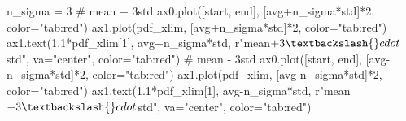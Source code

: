 \documentclass[
  letterpaper,
  DIV=11,
  numbers=noendperiod,
  oneside]{scrreprt}
\newenvironment{Shaded}{\begin{snugshade}}{\end{snugshade}}
\newcommand{\CommentTok}[1]{\textcolor[rgb]{0.37,0.37,0.37}{#1}}
\newcommand{\DecValTok}[1]{\textcolor[rgb]{0.68,0.00,0.00}{#1}}
\newcommand{\FloatTok}[1]{\textcolor[rgb]{0.68,0.00,0.00}{#1}}
\newcommand{\NormalTok}[1]{\textcolor[rgb]{0.00,0.23,0.31}{#1}}
\newcommand{\OperatorTok}[1]{\textcolor[rgb]{0.37,0.37,0.37}{#1}}
\newcommand{\StringTok}[1]{\textcolor[rgb]{0.13,0.47,0.30}{#1}}
\newcommand{\VerbatimStringTok}[1]{\textcolor[rgb]{0.13,0.47,0.30}{#1}}
\begin{document}
\begin{Shaded}
\begin{Highlighting}[]
\NormalTok{n\_sigma }\OperatorTok{=} \DecValTok{3}
\CommentTok{\# mean + 3std}
\NormalTok{ax0.plot([start, end], [avg}\OperatorTok{+}\NormalTok{n\_sigma}\OperatorTok{*}\NormalTok{std]}\OperatorTok{*}\DecValTok{2}\NormalTok{, color}\OperatorTok{=}\StringTok{"tab:red"}\NormalTok{)}
\NormalTok{ax1.plot(pdf\_xlim, [avg}\OperatorTok{+}\NormalTok{n\_sigma}\OperatorTok{*}\NormalTok{std]}\OperatorTok{*}\DecValTok{2}\NormalTok{, color}\OperatorTok{=}\StringTok{"tab:red"}\NormalTok{)}
\NormalTok{ax1.text(}\FloatTok{1.1}\OperatorTok{*}\NormalTok{pdf\_xlim[}\DecValTok{1}\NormalTok{], avg}\OperatorTok{+}\NormalTok{n\_sigma}\OperatorTok{*}\NormalTok{std, }\VerbatimStringTok{r"mean$+3\textbackslash{}cdot$std"}\NormalTok{, va}\OperatorTok{=}\StringTok{"center"}\NormalTok{, color}\OperatorTok{=}\StringTok{"tab:red"}\NormalTok{)}
\CommentTok{\# mean {-} 3std}
\NormalTok{ax0.plot([start, end], [avg}\OperatorTok{{-}}\NormalTok{n\_sigma}\OperatorTok{*}\NormalTok{std]}\OperatorTok{*}\DecValTok{2}\NormalTok{, color}\OperatorTok{=}\StringTok{"tab:red"}\NormalTok{)}
\NormalTok{ax1.plot(pdf\_xlim, [avg}\OperatorTok{{-}}\NormalTok{n\_sigma}\OperatorTok{*}\NormalTok{std]}\OperatorTok{*}\DecValTok{2}\NormalTok{, color}\OperatorTok{=}\StringTok{"tab:red"}\NormalTok{)}
\NormalTok{ax1.text(}\FloatTok{1.1}\OperatorTok{*}\NormalTok{pdf\_xlim[}\DecValTok{1}\NormalTok{], avg}\OperatorTok{{-}}\NormalTok{n\_sigma}\OperatorTok{*}\NormalTok{std, }\VerbatimStringTok{r"mean${-}3\textbackslash{}cdot$std"}\NormalTok{, va}\OperatorTok{=}\StringTok{"center"}\NormalTok{, color}\OperatorTok{=}\StringTok{"tab:red"}\NormalTok{)}


\end{Highlighting}
\end{Shaded}
\end{document}
